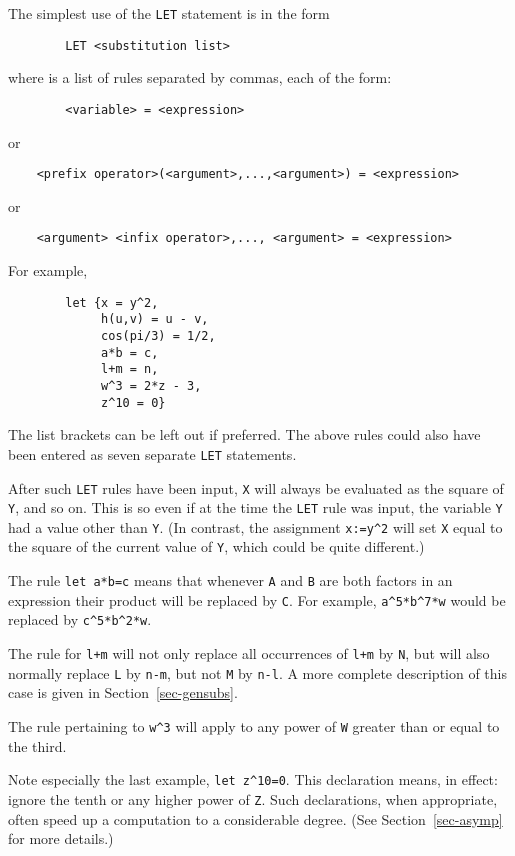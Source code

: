The simplest use of the {\tt LET} statement is in the form
\begin{verbatim}
        LET <substitution list>
\end{verbatim}
where {\tt <substitution list>} is a list of rules separated by commas, each
of the form:
\begin{verbatim}
        <variable> = <expression>
\end{verbatim}
or
\begin{verbatim}
    <prefix operator>(<argument>,...,<argument>) = <expression>
\end{verbatim}
or
\begin{verbatim}
    <argument> <infix operator>,..., <argument> = <expression>
\end{verbatim}
For example,
\begin{verbatim}
        let {x = y^2,
             h(u,v) = u - v,
             cos(pi/3) = 1/2,
             a*b = c,
             l+m = n,
             w^3 = 2*z - 3,
             z^10 = 0}
\end{verbatim}
The list brackets can be left out if preferred.  The above rules could
also have been entered as seven separate {\tt LET} statements.

After such {\tt LET} rules have been input, {\tt X} will always be
evaluated as the square of {\tt Y}, and so on.  This is so even if at the
time the {\tt LET} rule was input, the variable {\tt Y} had a value other
than {\tt Y}. (In contrast, the assignment {\tt x:=y\verb|^|2} will set {\tt X}
equal to the square of the current value of {\tt Y}, which could be quite
different.)

The rule {\tt let a*b=c} means that whenever {\tt A} and {\tt B} are both
factors in an expression their product will be replaced by {\tt C}.  For
example, {\tt a\verb|^|5*b\verb|^|7*w} would be replaced by
{\tt c\verb|^|5*b\verb|^|2*w}.

The rule for {\tt l+m} will not only replace all occurrences of {\tt l+m}
by {\tt N}, but will also normally replace {\tt L} by {\tt n-m}, but not
{\tt M} by {\tt n-l}.  A more complete description of this case is given
in Section~\ref{sec-gensubs}.

The rule pertaining to {\tt w\verb|^|3} will apply to any power of {\tt W}
greater than or equal to the third.

Note especially the last example, {\tt let z\verb|^|10=0}.  This declaration
means, in effect: ignore the tenth or any higher power of {\tt Z}.  Such
declarations, when appropriate, often speed up a computation to a
considerable degree. (See
Section~\ref{sec-asymp} for more details.)

